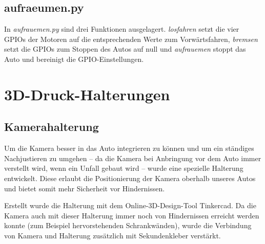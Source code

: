 \documentclass[a4paper, 12pt]{scrartcl}
\begin{document}
\subsection{aufraeumen.py}


In \textit{aufrauemen.py} sind drei Funktionen ausgelagert. \textit{losfahren} setzt die vier GPIOs der Motoren auf die entsprechenden Werte zum Vorwärtsfahren, \textit{bremsen} setzt die GPIOs zum Stoppen des Autos auf null und \textit{aufrauemen} stoppt das Auto und bereinigt die GPIO-Einstellungen.

\section{3D-Druck-Halterungen}

\subsection{Kamerahalterung}

Um die Kamera besser in das Auto integrieren zu können und um ein ständiges Nachjustieren zu umgehen -- da die Kamera bei Anbringung vor dem Auto immer verstellt wird, wenn ein Unfall gebaut wird -- wurde eine spezielle Halterung entwickelt. Diese erlaubt die Positionierung der Kamera oberhalb unseres Autos und bietet somit mehr Sicherheit vor Hindernissen.

Erstellt wurde die Halterung mit dem Online-3D-Design-Tool Tinkercad. Da die Kamera auch mit dieser Halterung immer noch von Hindernissen erreicht werden konnte (zum Beispiel hervorstehenden Schrankwänden), wurde die Verbindung von Kamera und Halterung zusätzlich mit Sekundenkleber verstärkt. 
\end{document}
